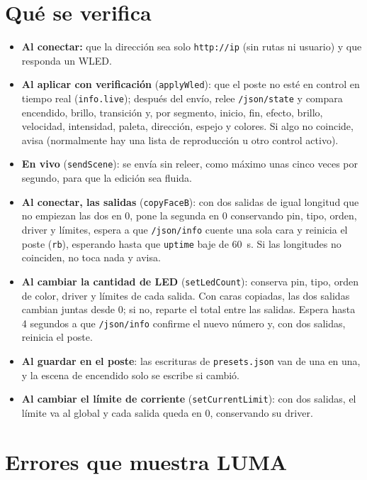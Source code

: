 \section{Qué se verifica}

\begin{itemize}
\item \textbf{Al conectar:} que la dirección sea solo \texttt{http://ip} (sin rutas ni usuario) y que responda un WLED.
\item \textbf{Al aplicar con verificación} (\texttt{applyWled}): que el poste no esté en control en tiempo real (\texttt{info.live}); después del envío, relee \texttt{/json/state} y compara encendido, brillo, transición y, por segmento, inicio, fin, efecto, brillo, velocidad, intensidad, paleta, dirección, espejo y colores. Si algo no coincide, avisa (normalmente hay una lista de reproducción u otro control activo).
\item \textbf{En vivo} (\texttt{sendScene}): se envía sin releer, como máximo unas cinco veces por segundo, para que la edición sea fluida.
\item \textbf{Al conectar, las salidas} (\texttt{copyFaceB}): con dos salidas de igual longitud que no empiezan las dos en 0, pone la segunda en 0 conservando pin, tipo, orden, driver y límites, espera a que \texttt{/json/info} cuente una sola cara y reinicia el poste (\texttt{rb}), esperando hasta que \texttt{uptime} baje de 60~s. Si las longitudes no coinciden, no toca nada y avisa.
\item \textbf{Al cambiar la cantidad de LED} (\texttt{setLedCount}): conserva pin, tipo, orden de color, driver y límites de cada salida. Con caras copiadas, las dos salidas cambian juntas desde 0; si no, reparte el total entre las salidas. Espera hasta 4 segundos a que \texttt{/json/info} confirme el nuevo número y, con dos salidas, reinicia el poste.
\item \textbf{Al guardar en el poste}: las escrituras de \texttt{presets.json} van de una en una, y la escena de encendido solo se escribe si cambió.
\item \textbf{Al cambiar el límite de corriente} (\texttt{setCurrentLimit}): con dos salidas, el límite va al global y cada salida queda en 0, conservando su driver.
\end{itemize}

\section{Errores que muestra LUMA}

